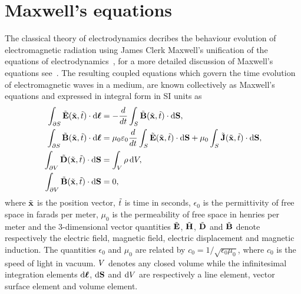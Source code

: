 \section{Maxwell's equations}
The classical theory of electrodynamics decribes the behaviour evolution of electromagnetic radiation using James Clerk Maxwell's unification of the equations of electrodynamics~\cite{Maxwell:1863ur}, for a more detailed discussion of Maxwell's equations see~\cite{Balanis:ui,Jackson:490457}. The resulting coupled equations which govern the time evolution of electromagnetic waves in a medium, are known collectively as Maxwell's equations and expressed in integral form in SI units as
\begin{subequations}
\begin{align}
    \int_{\partial S} \tilde{\mathbf{E}}(\tilde{\mathbf{x}},\tilde{t}) \cdot \mathrm{d}\boldsymbol{\ell}  &= - \frac{d}{dt} \int_{S} \tilde{\mathbf{B}}(\tilde{\mathbf{x}},\tilde{t}) \cdot \mathrm{d}\mathbf{S}, \label{eq:maxwell-faraday-integral} \\
    \int_{\partial S} \tilde{\mathbf{B}}(\tilde{\mathbf{x}},\tilde{t}) \cdot \mathrm{d}\boldsymbol{\ell} &= \mu_0 \varepsilon_0 \frac{d}{dt} \int_{S} \tilde{\mathbf{E}}(\tilde{\mathbf{x}},\tilde{t}) \cdot \mathrm{d}\mathbf{S} +  \mu_0 \int_{S} \tilde{\mathbf{J}}(\tilde{\mathbf{x}},\tilde{t}) \cdot \mathrm{d}\mathbf{S}, \label{eq:maxwell-ampere-integral} \\
    \int_{\partial V} \tilde{\mathbf{D}}(\tilde{\mathbf{x}},\tilde{t})\cdot\mathrm{d}\mathbf{S} &= \int_V \rho \,\mathrm{d}V, \label{maxwell-gauss-integral} \\
    \int_{\partial V} \tilde{\mathbf{B}}(\tilde{\mathbf{x}},\tilde{t})\cdot\mathrm{d}\mathbf{S} &= 0, \label{maxwell-gauss-magnetism-integral}
\end{align}
\end{subequations}
where $\tilde{\mathbf{x}}$ is the position vector, $\tilde{t}$ is time in seconds, $\epsilon_0$ is the permittivity of free space in farads per meter, $\mu_0$ is the permeability of free space in henries per meter and the 3-dimensional vector quantities $\tilde{\mathbf{E}}$, $\tilde{\mathbf{H}}$, $\tilde{\mathbf{D}}$ and $\tilde{\mathbf{B}}$ denote respectively the electric field, magnetic field, electric displacement and magnetic induction. The quantities $\epsilon_0$ and $\mu_0$ are related by $c_0 = 1/ \sqrt{\epsilon_0 \mu_0}$, where $c_0$ is the speed of light in vacuum.
$V$ denotes any closed volume while the infinitesimal integration elements $\mathrm{d}\boldsymbol{\ell}$, $\mathrm{d}\mathbf{S}$ and $\mathrm{d}V$ are respectively a line element, vector surface element and volume element.
